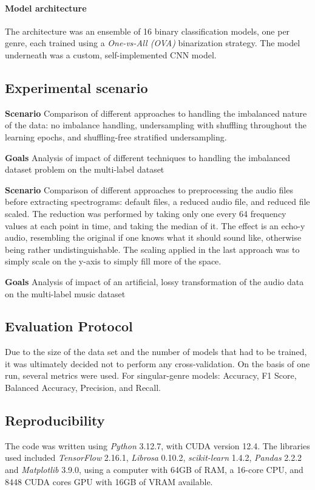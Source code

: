 \documentclass[runningheads]{llncs}
\begin{document}
\paragraph{Model architecture}

The architecture was an ensemble of 16 binary classification models, one per genre, each trained using a \textit{One-vs-All (OVA)} binarization strategy. The model underneath was a custom, self-implemented CNN model.

\subsection{Experimental scenario}

\textbf{Scenario} Comparison of different approaches to handling the imbalanced nature of the data: no imbalance handling, undersampling with shuffling throughout the learning epochs, and shuffling-free stratified undersampling.

\textbf{Goals} Analysis of impact of different techniques to handling the imbalanced dataset problem on the multi-label dataset

\textbf{Scenario} Comparison of different approaches to preprocessing the audio files before extracting spectrograms: default files, a reduced audio file, and reduced file scaled. The reduction was performed by taking only one every 64 frequency values at each point in time, and taking the median of it. The effect is an echo-y audio, resembling the original if one knows what it should sound like, otherwise being rather undistinguishable. The scaling applied in the last approach was to simply scale on the y-axis to simply fill more of the space. 

\textbf{Goals} Analysis of impact of an artificial, lossy transformation of the audio data on the multi-label music dataset

\subsection{Evaluation Protocol}
Due to the size of the data set and the number of models that had to be trained, it was ultimately decided not to perform any cross-validation. On the basis of one run, several metrics were used. For singular-genre models: Accuracy, F1 Score, Balanced Accuracy, Precision, and Recall.

\subsection{Reproducibility}
The code was written using \textit{Python} 3.12.7, with CUDA version 12.4. The libraries used included \textit{TensorFlow} 2.16.1, \textit{Librosa} 0.10.2, \textit{scikit-learn} 1.4.2, \textit{Pandas} 2.2.2 and \textit{Matplotlib} 3.9.0, using a computer with 64GB of RAM, a 16-core CPU, and 8448 CUDA cores GPU with 16GB of VRAM available.
\end{document}
